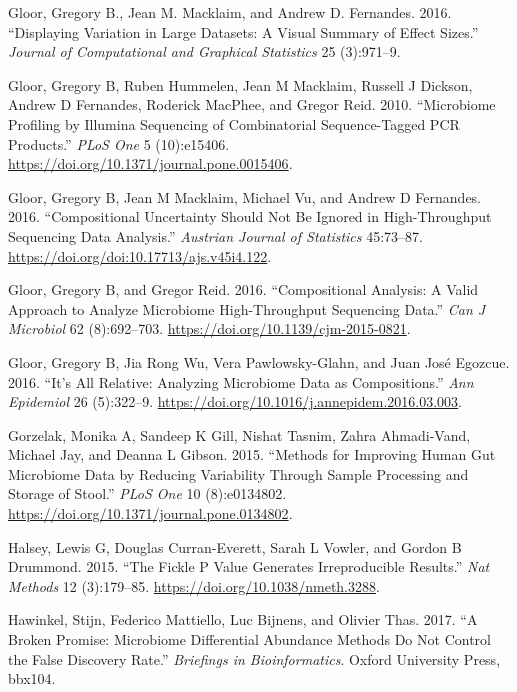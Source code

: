 \documentclass[onecolumn]{book}
\theoremstyle{definition}
\theoremstyle{definition}
\theoremstyle{definition}
\theoremstyle{remark}
\begin{document}
\leavevmode\hypertarget{ref-Gloor:2015}{}%
Gloor, Gregory B., Jean M. Macklaim, and Andrew D. Fernandes. 2016.
``Displaying Variation in Large Datasets: A Visual Summary of Effect
Sizes.'' \emph{Journal of Computational and Graphical Statistics} 25
(3):971--9.

\leavevmode\hypertarget{ref-Gloor:2010}{}%
Gloor, Gregory B, Ruben Hummelen, Jean M Macklaim, Russell J Dickson,
Andrew D Fernandes, Roderick MacPhee, and Gregor Reid. 2010.
``Microbiome Profiling by Illumina Sequencing of Combinatorial
Sequence-Tagged PCR Products.'' \emph{PLoS One} 5 (10):e15406.
\url{https://doi.org/10.1371/journal.pone.0015406}.

\leavevmode\hypertarget{ref-gloorAJS:2016}{}%
Gloor, Gregory B, Jean M Macklaim, Michael Vu, and Andrew D Fernandes.
2016. ``Compositional Uncertainty Should Not Be Ignored in
High-Throughput Sequencing Data Analysis.'' \emph{Austrian Journal of
Statistics} 45:73--87. \url{https://doi.org/doi:10.17713/ajs.v45i4.122}.

\leavevmode\hypertarget{ref-Gloor:2016cjm}{}%
Gloor, Gregory B, and Gregor Reid. 2016. ``Compositional Analysis: A
Valid Approach to Analyze Microbiome High-Throughput Sequencing Data.''
\emph{Can J Microbiol} 62 (8):692--703.
\url{https://doi.org/10.1139/cjm-2015-0821}.

\leavevmode\hypertarget{ref-gloor2016s}{}%
Gloor, Gregory B, Jia Rong Wu, Vera Pawlowsky-Glahn, and Juan José
Egozcue. 2016. ``It's All Relative: Analyzing Microbiome Data as
Compositions.'' \emph{Ann Epidemiol} 26 (5):322--9.
\url{https://doi.org/10.1016/j.annepidem.2016.03.003}.

\leavevmode\hypertarget{ref-Gorzelak:2015aa}{}%
Gorzelak, Monika A, Sandeep K Gill, Nishat Tasnim, Zahra Ahmadi-Vand,
Michael Jay, and Deanna L Gibson. 2015. ``Methods for Improving Human
Gut Microbiome Data by Reducing Variability Through Sample Processing
and Storage of Stool.'' \emph{PLoS One} 10 (8):e0134802.
\url{https://doi.org/10.1371/journal.pone.0134802}.

\leavevmode\hypertarget{ref-Halsey:2015aa}{}%
Halsey, Lewis G, Douglas Curran-Everett, Sarah L Vowler, and Gordon B
Drummond. 2015. ``The Fickle P Value Generates Irreproducible Results.''
\emph{Nat Methods} 12 (3):179--85.
\url{https://doi.org/10.1038/nmeth.3288}.

\leavevmode\hypertarget{ref-hawinkel2017}{}%
Hawinkel, Stijn, Federico Mattiello, Luc Bijnens, and Olivier Thas.
2017. ``A Broken Promise: Microbiome Differential Abundance Methods Do
Not Control the False Discovery Rate.'' \emph{Briefings in
Bioinformatics}. Oxford University Press, bbx104.
\end{document}
